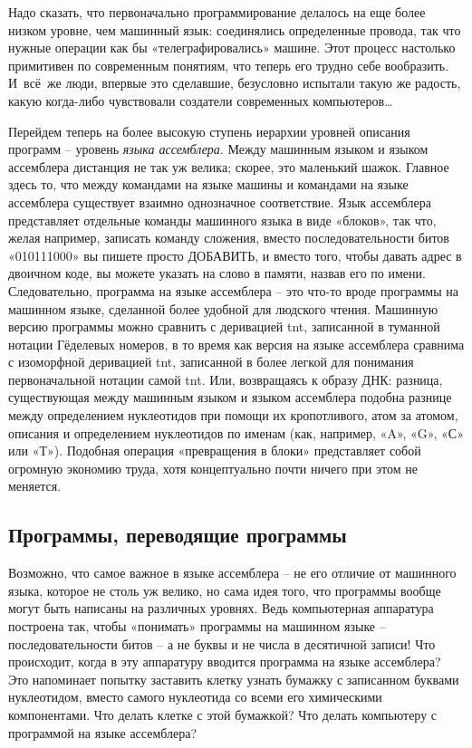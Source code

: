\documentclass[../main.tex]{subfiles}
\begin{document}
Надо сказать, что первоначально программирование делалось на еще более низком уровне, чем машинный язык: соединялись определенные провода, так что нужные операции как бы «телеграфировались» машине. Этот процесс настолько примитивен по современным понятиям, что теперь его трудно себе вообразить. И~всё~же люди, впервые это сделавшие, безусловно испытали такую же радость, какую когда-либо чувствовали создатели современных компьютеров\ldots{}

Перейдем теперь на более высокую ступень иерархии уровней описания программ \--- уровень \emph{языка ассемблера}. Между машинным языком и языком ассемблера дистанция не так уж велика; скорее, это маленький шажок. Главное здесь то, что между командами на языке машины и командами на языке ассемблера существует взаимно однозначное соответствие. Язык ассемблера представляет отдельные команды машинного языка в виде «блоков», так что, желая например, записать команду сложения, вместо последовательности битов «010111000» вы пишете просто ДОБАВИТЬ, и вместо того, чтобы давать адрес в двоичном коде, вы можете указать на слово в памяти, назвав его по имени. Следовательно, программа на языке ассемблера \--- это что-то вроде программы на машинном языке, сделанной более удобной для людского чтения. Машинную версию программы можно сравнить с деривацией \acs{tnt}, записанной в туманной нотации Гёделевых номеров, в то время как версия на языке ассемблера сравнима с изоморфной деривацией \acs{tnt}, записанной в более легкой для понимания первоначальной нотации самой \acs{tnt}\@. Или, возвращаясь к образу ДНК: разница, существующая между машинным языком и языком ассемблера подобна разнице между определением нуклеотидов при помощи их кропотливого, атом за атомом, описания и определением нуклеотидов по именам (как, например, «A», «G», «С» или «Т»). Подобная операция «превращения в блоки» представляет собой огромную экономию труда, хотя концептуально почти ничего при этом не меняется.


\subsection{Программы, переводящие программы}

Возможно, что самое важное в языке ассемблера \--- не его отличие от машинного языка, которое не столь уж велико, но сама идея того, что программы вообще могут быть написаны на различных уровнях. Ведь компьютерная аппаратура построена так, чтобы «понимать» программы на машинном языке \--- последовательности битов \--- а не буквы и не числа в десятичной записи! Что происходит, когда в эту аппаратуру вводится программа на языке ассемблера? Это напоминает попытку заставить клетку узнать бумажку с записанном буквами нуклеотидом, вместо самого нуклеотида со всеми его химическими компонентами. Что делать клетке с этой бумажкой? Что делать компьютеру с программой на языке ассемблера?
\end{document}
